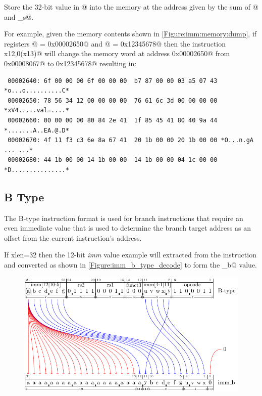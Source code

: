 \begin{itemize}
Store the 32-bit value in @ into the memory at the address given
by the sum of @ and \verb@imm_s@.

For example, given the memory contents shown in \autoref{Figure:imm:memory:dump},
if registers @ = \verb@0x00002650@ and @ = \verb@0x12345678@
then the instruction \verb@sw x12,0(x13)@ will change the memory word at address
\verb@0x00002650@ from \verb@0x00008067@ to \verb@0x12345678@ resulting in:

\begin{verbatim}
 00002640: 6f 00 00 00 6f 00 00 00  b7 87 00 00 03 a5 07 43 *o...o..........C*
 00002650: 78 56 34 12 00 00 00 00  76 61 6c 3d 00 00 00 00 *xV4.....val=....*
 00002660: 00 00 00 00 80 84 2e 41  1f 85 45 41 80 40 9a 44 *.......A..EA.@.D*
 00002670: 4f 11 f3 c3 6e 8a 67 41  20 1b 00 00 20 1b 00 00 *O...n.gA ... ...*
 00002680: 44 1b 00 00 14 1b 00 00  14 1b 00 00 04 1c 00 00 *D...............*
\end{verbatim}

\end{itemize}

\subsection{B Type}
\label{insnformat:btype}

The B-type instruction format is used for branch instructions that
require an even immediate value that is used to determine the
branch target address as an offset from the current instruction's
address.

If \Gls{xlen}=32 then the 12-bit {\em imm} value example will extracted from
the instruction and converted as shown in \autoref{Figure:imm_b_type_decode}
to form the \verb@imm_b@ value.

\begin{figure}[ht]
  \centering
  \includegraphics{figures/chapter05/BTypeDecode.pdf}
  \label{Figure:imm_b_type_decode}
  \label{imm.b:decode}
\end{figure}

